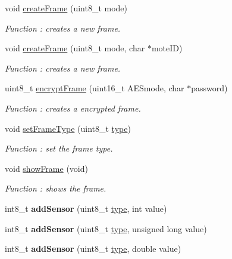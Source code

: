 \begin{DoxyCompactItemize}
void \hyperlink{class_wasp_frame_af8d3c753741d91c8a81c7fd154ebb9d0}{create\+Frame} (uint8\+\_\+t mode)
\begin{DoxyCompactList}\small\item\em Function \+: creates a new frame. \end{DoxyCompactList}\item 
void \hyperlink{class_wasp_frame_a729ef7bf28291ef4119a1edc549d9dec}{create\+Frame} (uint8\+\_\+t mode, char $\ast$mote\+ID)
\begin{DoxyCompactList}\small\item\em Function \+: creates a new frame. \end{DoxyCompactList}\item 
uint8\+\_\+t \hyperlink{class_wasp_frame_a20bae50eb9160ba9e675d6824bb21fc6}{encrypt\+Frame} (uint16\+\_\+t A\+E\+Smode, char $\ast$password)
\begin{DoxyCompactList}\small\item\em Function \+: creates a encrypted frame. \end{DoxyCompactList}\item 
void \hyperlink{class_wasp_frame_a32769034ed6b5908e9a843523435fd2a}{set\+Frame\+Type} (uint8\+\_\+t \hyperlink{_sd_fat_structs_8h_a1d127017fb298b889f4ba24752d08b8e}{type})
\begin{DoxyCompactList}\small\item\em Function \+: set the frame type. \end{DoxyCompactList}\item 
void \hyperlink{class_wasp_frame_a66927201adb1147c61b149b3f7efd8a7}{show\+Frame} (void)
\begin{DoxyCompactList}\small\item\em Function \+: shows the frame. \end{DoxyCompactList}\item 
int8\+\_\+t {\bfseries add\+Sensor} (uint8\+\_\+t \hyperlink{_sd_fat_structs_8h_a1d127017fb298b889f4ba24752d08b8e}{type}, int value)\hypertarget{class_wasp_frame_aa58efc64c584f728b1a2842690a68481}{}\label{class_wasp_frame_aa58efc64c584f728b1a2842690a68481}

\item 
int8\+\_\+t {\bfseries add\+Sensor} (uint8\+\_\+t \hyperlink{_sd_fat_structs_8h_a1d127017fb298b889f4ba24752d08b8e}{type}, unsigned long value)\hypertarget{class_wasp_frame_a79c271fc197fdebb9305400724e815be}{}\label{class_wasp_frame_a79c271fc197fdebb9305400724e815be}

\item 
int8\+\_\+t {\bfseries add\+Sensor} (uint8\+\_\+t \hyperlink{_sd_fat_structs_8h_a1d127017fb298b889f4ba24752d08b8e}{type}, double value)\hypertarget{class_wasp_frame_a3e3d14117ca1dc2651dc918adfe5d5e2}{}\label{class_wasp_frame_a3e3d14117ca1dc2651dc918adfe5d5e2}


\end{DoxyCompactItemize}
